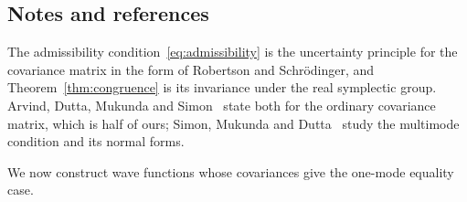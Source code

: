 \begin{vetxenv}
\subsection*{Notes and references}
The admissibility condition~\eqref{eq:admissibility} is the uncertainty principle for the covariance matrix in the form of
Robertson and Schr\"odinger, and Theorem~\ref{thm:congruence} is its invariance under the real symplectic group. Arvind,
Dutta, Mukunda and Simon~\cite[Secs.~VIII--IX]{adms} state both for the ordinary covariance matrix, which is half of ours;
Simon, Mukunda and Dutta~\cite{smd} study the multimode condition and its normal forms.
\end{vetxenv}

\medskip
\noindent We now construct wave functions whose covariances give the one-mode equality case.
